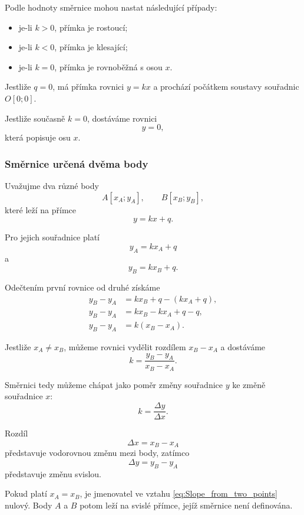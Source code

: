 Podle hodnoty směrnice mohou nastat následující případy:
\begin{itemize}
    \item je-li $k>0$, přímka je rostoucí;
    \item je-li $k<0$, přímka je klesající;
    \item je-li $k=0$, přímka je rovnoběžná s osou $x$.
\end{itemize}

\begin{remark}\label{rem:Special_slope_intercept_coefficients}
    Jestliže $q=0$, má přímka rovnici $y=kx$ a prochází počátkem soustavy souřadnic $O[0;0]$.

    Jestliže současně $k=0$, dostáváme rovnici
    \[
        y=0,
    \]
    která popisuje osu $x$.
\end{remark}

\subsubsection{Směrnice určená dvěma body}
\label{subsubsec:Slope_from_two_points}

Uvažujme dva různé body
\[
    A[x_A;y_A],
    \qquad
    B[x_B;y_B],
\]
které leží na přímce
\[
    y=kx+q.
\]

Pro jejich souřadnice platí
\[
    y_A=kx_A+q
\]
a
\[
    y_B=kx_B+q.
\]

Odečtením první rovnice od druhé získáme
\begin{align*}
    y_B-y_A &= kx_B+q-(kx_A+q),\\
    y_B-y_A &= kx_B-kx_A+q-q, \\
    y_B-y_A &= k(x_B-x_A).
\end{align*}

Jestliže $x_A\neq x_B$, můžeme rovnici vydělit rozdílem
$x_B-x_A$ a dostáváme
\begin{equation}\label{eq:Slope_from_two_points}
    k=
    \frac{y_B-y_A}{x_B-x_A}.
\end{equation}

Směrnici tedy můžeme chápat jako poměr změny souřadnice $y$ ke změně
souřadnice $x$:
\[
    k=\frac{\Delta y}{\Delta x}.
\]

Rozdíl
\[
    \Delta x=x_B-x_A
\]
představuje vodorovnou změnu mezi body, zatímco
\[
    \Delta y=y_B-y_A
\]
představuje změnu svislou.

Pokud platí $x_A=x_B$, je jmenovatel ve vztahu
\eqref{eq:Slope_from_two_points} nulový. Body $A$ a $B$ potom leží na
svislé přímce, jejíž směrnice není definována.

